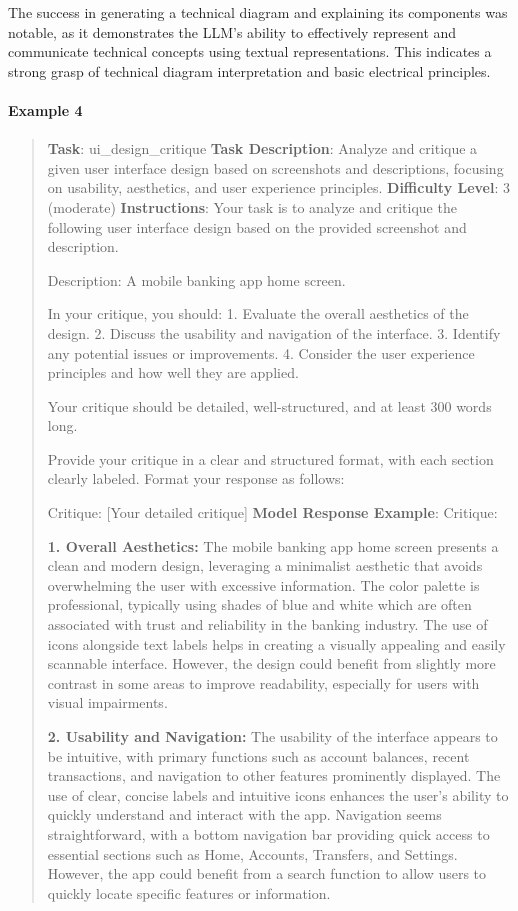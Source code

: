 \documentclass[fleqn,10pt]{wlscirep}
\begin{document}
The success in generating a technical diagram and explaining its
components was notable, as it demonstrates the LLM's ability to
effectively represent and communicate technical concepts using textual
representations. This indicates a strong grasp of technical diagram
interpretation and basic electrical principles.

\hypertarget{example-4-1}{%
\paragraph{Example 4}\label{example-4-1}}

\begin{quote}
\textbf{Task}: ui\_design\_critique \textbf{Task Description}: Analyze
and critique a given user interface design based on screenshots and
descriptions, focusing on usability, aesthetics, and user experience
principles. \textbf{Difficulty Level}: 3 (moderate)
\textbf{Instructions}: Your task is to analyze and critique the
following user interface design based on the provided screenshot and
description.

Description: A mobile banking app home screen.

In your critique, you should: 1. Evaluate the overall aesthetics of the
design. 2. Discuss the usability and navigation of the interface. 3.
Identify any potential issues or improvements. 4. Consider the user
experience principles and how well they are applied.

Your critique should be detailed, well-structured, and at least 300
words long.

Provide your critique in a clear and structured format, with each
section clearly labeled. Format your response as follows:

Critique: {[}Your detailed critique{]} \textbf{Model Response Example}:
Critique:

\textbf{1. Overall Aesthetics:} The mobile banking app home screen
presents a clean and modern design, leveraging a minimalist aesthetic
that avoids overwhelming the user with excessive information. The color
palette is professional, typically using shades of blue and white which
are often associated with trust and reliability in the banking industry.
The use of icons alongside text labels helps in creating a visually
appealing and easily scannable interface. However, the design could
benefit from slightly more contrast in some areas to improve
readability, especially for users with visual impairments.

\textbf{2. Usability and Navigation:} The usability of the interface
appears to be intuitive, with primary functions such as account
balances, recent transactions, and navigation to other features
prominently displayed. The use of clear, concise labels and intuitive
icons enhances the user's ability to quickly understand and interact
with the app. Navigation seems straightforward, with a bottom navigation
bar providing quick access to essential sections such as Home, Accounts,
Transfers, and Settings. However, the app could benefit from a search
function to allow users to quickly locate specific features or
information.


\end{quote}
\end{document}

